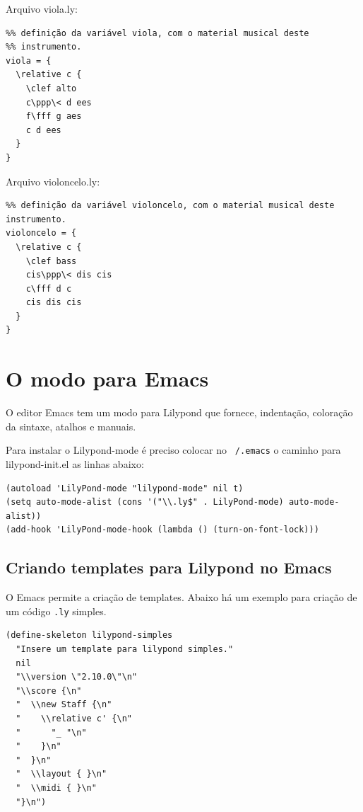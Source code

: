 \documentclass[12pt,brazil]{book}
\begin{document}
Arquivo viola.ly:

\begin{verbatim}
%% definição da variável viola, com o material musical deste
%% instrumento.
viola = {
  \relative c {
    \clef alto
    c\ppp\< d ees
    f\fff g aes
    c d ees
  }
}
\end{verbatim}

Arquivo violoncelo.ly:

\begin{verbatim}
%% definição da variável violoncelo, com o material musical deste instrumento.
violoncelo = {
  \relative c {
    \clef bass
    cis\ppp\< dis cis
    c\fff d c
    cis dis cis
  }
}
\end{verbatim}

\section{O modo para Emacs}
\label{sec:o-modo-para-3}

O editor Emacs tem um modo para Lilypond que fornece, indentação,
coloração da sintaxe, atalhos e manuais.

Para instalar o Lilypond-mode é preciso colocar no \texttt{~/.emacs} o
caminho para lilypond-init.el as linhas abaixo:

\begin{verbatim}
(autoload 'LilyPond-mode "lilypond-mode" nil t)
(setq auto-mode-alist (cons '("\\.ly$" . LilyPond-mode) auto-mode-alist))
(add-hook 'LilyPond-mode-hook (lambda () (turn-on-font-lock)))
\end{verbatim}

\subsection{Criando templates para Lilypond no Emacs}
\label{sec:criando-templ-para}

O Emacs permite a criação de templates. Abaixo há um exemplo para
criação de um código \texttt{.ly} simples.

\begin{verbatim}
(define-skeleton lilypond-simples
  "Insere um template para lilypond simples."
  nil
  "\\version \"2.10.0\"\n"
  "\\score {\n"
  "  \\new Staff {\n"
  "    \\relative c' {\n"
  "      "_ "\n"
  "    }\n"
  "  }\n"
  "  \\layout { }\n"
  "  \\midi { }\n"
  "}\n")
\end{verbatim}
\end{document}
